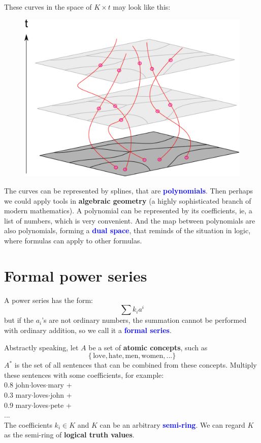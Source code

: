 \documentclass[12pt]{article}
\newcommand{\concept}[1]{\textbf{\textcolor{blue}{#1}}}
\newcommand{\formula}[1]{\textcolor{LogicColor}{#1}}
\newcommand{\tab}{\hspace*{1cm}}
\begin{document}
These curves in the space of $K \times t$ may look like this:
\begin{figure}[H]
\centering
\includegraphics[scale=0.75]{polynomial-hairs.png}
\end{figure}

The curves can be represented by splines, that are \concept{polynomials}.  Then perhaps we could apply tools in \textbf{algebraic geometry} (a highly sophisticated branch of modern mathematics).  A polynomial can be represented by its coefficients, ie, a list of numbers, which is very convenient.   And the map between polynomials are also polynomials, forming a \concept{dual space}, that reminds of the situation in logic, where formulas can apply to other formulas.

\section{Formal power series}

A power series has the form:
$$ \sum k_i a^i $$
but if the $a_i$'s are not ordinary numbers, the summation cannot be performed with ordinary addition, so we call it a \concept{formal series}.

Abstractly speaking, let $A$ be a set of \textbf{atomic concepts}, such as
$$\{ \, \mbox{love}, \mbox{hate}, \mbox{men}, \mbox{women}, ... \}$$
$A^*$ is the set of all sentences that can be combined from these concepts.  Multiply these sentences with some coefficients, for example:\\
\tab 0.8 \formula{john$\cdot$loves$\cdot$mary} + \\
\tab 0.3 \formula{mary$\cdot$loves$\cdot$john} + \\
\tab 0.9 \formula{mary$\cdot$loves$\cdot$pete} + \\
\tab ... \\
The coefficients $k_i \in K$ and $K$ can be an arbitrary \concept{semi-ring}.  We can regard $K$ as the semi-ring of \textbf{logical truth values}.
\end{document}
